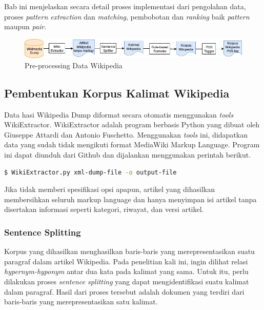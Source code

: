 \chapter{\babEmpat}
Bab ini menjelaskan secara detail proses implementasi dari pengolahan data, proses \textit{pattern extraction} dan \textit{matching}, pembobotan dan \textit{ranking} baik \textit{pattern} maupun \textit{pair}.

\begin{figure}
    \centering
    \includegraphics[width=\linewidth]{pics/Pic02-PreProcessingWikipedia}
    \caption{Pre-processing Data Wikipedia}
    \label{fig:preproses-wiki}
\end{figure}
\section{Pembentukan Korpus Kalimat Wikipedia}
Data hasi Wikipedia Dump diformat secara otomatis menggunakan \textit{tools} WikiExtractor. WikiExtractor adalah program berbasis Python yang dibuat oleh Giuseppe Attardi dan Antonio Fuschetto. Menggunakan \textit{tools} ini, didapatkan data yang sudah tidak mengikuti format MediaWiki Markup Language. Program ini dapat diunduh dari Github dan dijalankan menggunakan perintah berikut. 
\begin{lstlisting}[language=bash]
  $ WikiExtractor.py xml-dump-file -o output-file
\end{lstlisting}
Jika tidak memberi spesifikasi opsi apapun, artikel yang dihasilkan membersihkan seluruh markup language dan hanya menyimpan isi artikel tanpa disertakan informasi seperti kategori, riwayat, dan versi artikel.

\subsection{Sentence Splitting}
Korpus yang dihasilkan menghasilkan baris-baris yang merepresentasikan suatu paragraf dalam artikel Wikipedia. Pada penelitian kali ini, ingin dilihat relasi \textit{hypernym-hyponym} antar dua kata pada kalimat yang sama. Untuk itu, perlu dilakukan proses \textit{sentence splitting} yang dapat mengidentifikasi suatu kalimat dalam paragraf. Hasil dari proses tersebut adalah dokumen yang terdiri dari baris-baris yang merepresentasikan satu kalimat. 

